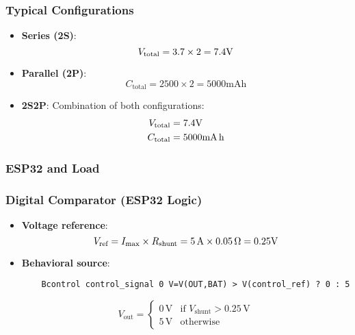 \subsubsection*{Typical Configurations}
\begin{itemize}
    \item \textbf{Series (2S)}: 
    \begin{equation}
        V_{\text{total}} = 3.7 \times 2 = 7.4\volt
    \end{equation}
    
    \item \textbf{Parallel (2P)}: 
    \begin{equation}
        C_{\text{total}} = 2500 \times 2 = 5000\si{\milli\ampere\hour}
    \end{equation}
    
    \item \textbf{2S2P}: Combination of both configurations:
    \begin{align*}
        V_{\text{total}} &= 7.4\volt \\
        C_{\text{total}} &= 5000\si{\milli\ampere\hour}
    \end{align*}
\end{itemize}

\subsubsection{ESP32 and Load}

\subsubsection*{Digital Comparator (ESP32 Logic)}
\begin{itemize}
\item \textbf{Voltage reference}:
  \begin{equation}
  V_{\text{ref}} = I_{\text{max}} \times R_{\text{shunt}} = 5\,\text{A} \times 0.05\,\ohm = 0.25\volt
  \end{equation}

\item \textbf{Behavioral source}:
\begin{verbatim}
    Bcontrol control_signal 0 V=V(OUT,BAT) > V(control_ref) ? 0 : 5
\end{verbatim}

\begin{equation}
V_{\text{out}} = 
\begin{cases}
0\,\text{V} & \text{if } V_{\text{shunt}} > 0.25\,\text{V} \\
5\,\text{V} & \text{otherwise}
\end{cases}
\end{equation}
\end{itemize}

